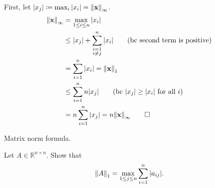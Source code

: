 \documentclass[boxes,pages]{homework}
\begin{document}
\begin{solution}
	First, let $\abs{x_j} \coloneqq \max_i \abs{x_i} = \norm{\vb{x}}_\infty$.
	\begin{align*}
		\norm{\vb{x}}_\infty & = \max_{1\leq i\leq n}\abs{x_i}                                                \\
		                     & \leq \abs{x_j} + \sum_{\substack{i = 1                                         \\ i\neq j}}^n\abs{x_i} \tag{bc second term is positive} \\
		                     & = \sum_{i=1}^n \abs{x_i} = \norm{\vb{x}}_1                                     \\
		                     & \leq \sum_{i = 1}^n n\abs{x_j} \tag{bc $\abs{x_j} \geq \abs{x_i}$ for all $i$} \\
		                     & = n\sum_{i = 1}	^n \abs{x_j} = n\norm{\vb{x}}_\infty \tag*{$\square$}
	\end{align*}
\end{solution}

\begin{problem}
Matrix norm formula.

Let $A\in\mathbb{R}^{n\times n}$. Show that
\begin{equation*}
	\norm{A}_1 = \max_{1\leq j \leq n}\sum_{i = 1}^n\abs{a_{ij}}.
\end{equation*}
\end{problem}
\end{document}

